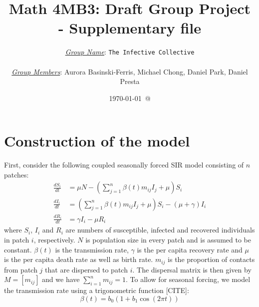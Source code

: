 \documentclass[12pt]{article}
\title{Math 4MB3: Draft Group Project - Supplementary file}
\author{\underline{\emph{Group Name}}: \texttt{{\color{blue}The Infective Collective}}\\
{}\\
\underline{\emph{Group Members}}: {\color{blue}Aurora Basinski-Ferris, Michael Chong, Daniel Park, Daniel Presta}}
\date{\today\ @ \thistime}
\begin{document}
\maketitle

\section{Construction of the model}

First, consider the following coupled seasonally forced SIR model consisting of $n$ patches:
\begin{equation}
\begin{aligned}
\frac{dS_i}{dt} &= \mu N - \left(\sum_{j=1}^n \beta(t) m_{ij} I_j + \mu\right) S_i \\
\frac{dI_i}{dt} &= \left(\sum_{j=1}^n \beta(t) m_{ij} I_j + \mu\right) S_i - (\mu  + \gamma) I_i\\
\frac{dR_i}{dt} &= \gamma I_i - \mu R_i
\end{aligned}
\end{equation}
where $S_i$, $I_i$ and $R_i$ are numbers of susceptible, infected and recovered individuals in patch $i$, respectively. 
$N$ is population size in every patch and is assumed to be constant. 
$\beta(t)$ is the transmission rate, $\gamma$ is the per capita recovery rate and $\mu$ is the per capita death rate as well as birth rate. 
$m_{ij}$ is the proportion of contacts from patch $j$ that are dispersed to patch $i$. 
The dispersal matrix is then given by $M = \left[m_{ij}\right]$ and we have $\sum_{i=1}^n m_{ij} = 1$. 
To allow for seasonal forcing, we model the transmission rate using a trigonometric function [CITE]:
\begin{equation}
\beta(t) = b_0 (1 + b_1 \cos(2 \pi t))
\end{equation}
\end{document}
